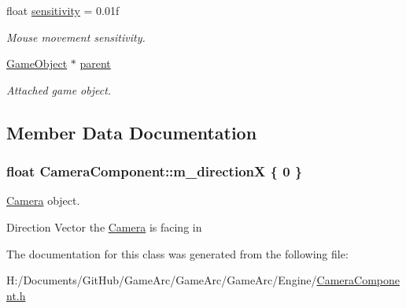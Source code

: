 \begin{DoxyCompactItemize}
\item 
\hypertarget{class_camera_component_acaa50f9d7c6df9e3c18dad170a1298fc}{float \hyperlink{class_camera_component_acaa50f9d7c6df9e3c18dad170a1298fc}{sensitivity} = 0.\+01f}\label{class_camera_component_acaa50f9d7c6df9e3c18dad170a1298fc}

\begin{DoxyCompactList}\small\item\em Mouse movement sensitivity. \end{DoxyCompactList}\item 
\hypertarget{class_camera_component_ae70994c6a86c59b0e6ab7482eb2cd403}{\hyperlink{class_game_object}{Game\+Object} $\ast$ \hyperlink{class_camera_component_ae70994c6a86c59b0e6ab7482eb2cd403}{parent}}\label{class_camera_component_ae70994c6a86c59b0e6ab7482eb2cd403}

\begin{DoxyCompactList}\small\item\em Attached game object. \end{DoxyCompactList}\end{DoxyCompactItemize}


\subsection{Member Data Documentation}
\hypertarget{class_camera_component_a7a95ace18cee6a6b88ac5873233e2cc3}{
\subsubsection[{m\+\_\+direction\+X}]{\setlength{\rightskip}{0pt plus 5cm}float Camera\+Component\+::m\+\_\+direction\+X \{ 0 \}}}\label{class_camera_component_a7a95ace18cee6a6b88ac5873233e2cc3}


\hyperlink{class_camera}{Camera} object. 

Direction Vector the \hyperlink{class_camera}{Camera} is facing in 

The documentation for this class was generated from the following file\+:\begin{DoxyCompactItemize}
\item 
H\+:/\+Documents/\+Git\+Hub/\+Game\+Arc/\+Game\+Arc/\+Game\+Arc/\+Engine/\hyperlink{_camera_component_8h}{Camera\+Component.\+h}\end{DoxyCompactItemize}
